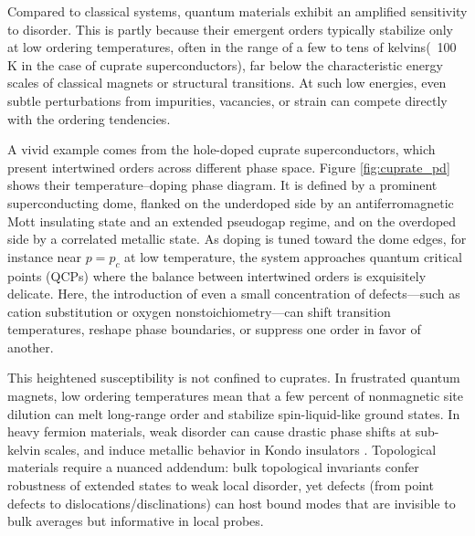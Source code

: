 Compared to classical systems, quantum materials exhibit an amplified sensitivity to disorder. This is partly because their emergent orders typically stabilize only at low ordering temperatures, often in the range of a few to tens of kelvins(~100 K in the case of cuprate superconductors), far below the characteristic energy scales of classical magnets or structural transitions. At such low energies, even subtle perturbations from impurities, vacancies, or strain can compete directly with the ordering tendencies.

A vivid example comes from the hole-doped cuprate superconductors, which present intertwined orders across different phase space\cite{fradkinIntertwinedOrdersPhysics2025}. Figure \ref {fig:cuprate_pd} shows their temperature–doping phase diagram. It is defined by a prominent superconducting dome, flanked on the underdoped side by an antiferromagnetic Mott insulating state and an extended pseudogap regime, and on the overdoped side by a correlated metallic state. As doping is tuned toward the dome edges, for instance near $p=p_c$ at low temperature, the system approaches quantum critical points (QCPs) where the balance between intertwined orders is exquisitely delicate. Here, the introduction of even a small concentration of defects—such as cation substitution or oxygen nonstoichiometry—can shift transition temperatures, reshape phase boundaries, or suppress one order in favor of another.

This heightened susceptibility is not confined to cuprates. In frustrated quantum magnets, low ordering temperatures mean that a few percent of nonmagnetic site dilution can melt long-range order and stabilize spin-liquid-like ground states\cite{syzranovEffectVacancyDefects2022}. In heavy fermion materials, weak disorder can cause drastic phase shifts at sub-kelvin scales\cite{toldinDisorderQuasiparticleInterference2013}\cite{gegenwartQuantumCriticalityHeavyfermion2008}, and induce metallic behavior in Kondo insulators \cite{pirieVisualizingAtomicscaleOrigin2023}. Topological materials require a nuanced addendum: bulk topological invariants confer robustness of extended states to weak local disorder, yet defects (from point defects to dislocations/disclinations) can host bound modes that are invisible to bulk averages but informative in local probes. 

